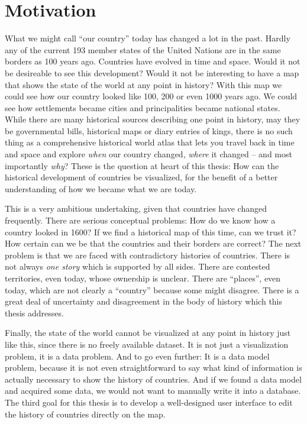 \section{Motivation} %
\label{sec:motivation}

What we might call ``our country'' today has changed a lot in the past. Hardly any of the current 193 member states of the United Nations are in the same borders as 100 years ago. Countries have evolved in time and space. Would it not be desireable to see this development? Would it not be interesting to have a map that shows the state of the world at any point in history? With this map we could see how our country looked like 100, 200 or even 1000 years ago. We could see how settlements became cities and principalities became national states. While there are many historical sources describing one point in history, may they be governmental bills, historical maps or diary entries of kings, there is no such thing as a comprehensive historical world atlas that lets you travel back in time and space and explore \emph{when} our country changed, \emph{where} it changed -- and most importantly \emph{why}? These is the question at heart of this thesis: How can the historical development of countries be visualized, for the benefit of a better understanding of how we became what we are today.

This is a very ambitious undertaking, given that countries have changed frequently. There are serious conceptual problems: How do we know how a country looked in 1600? If we find a historical map of this time, can we trust it? How certain can we be that the countries and their borders are correct? The next problem is that we are faced with contradictory histories of countries. There is not always \emph{one story} which is supported by all sides. There are contested territories, even today, whose ownership is unclear. There are ``places'', even today, which are not clearly a ``country'' because some might disagree. There is a great deal of uncertainty and disagreement in the body of history which this thesis addresses.

Finally, the state of the world cannot be visualized at any point in history just like this, since there is no freely available dataset. It is not just a visualization problem, it is a data problem. And to go even further: It is a data model problem, because it is not even straightforward to say what kind of information is actually necessary to show the history of countries. And if we found a data model and acquired some data, we would not want to manually write it into a database. The third goal for this thesis is to develop a well-designed user interface to edit the history of countries directly on the map.


